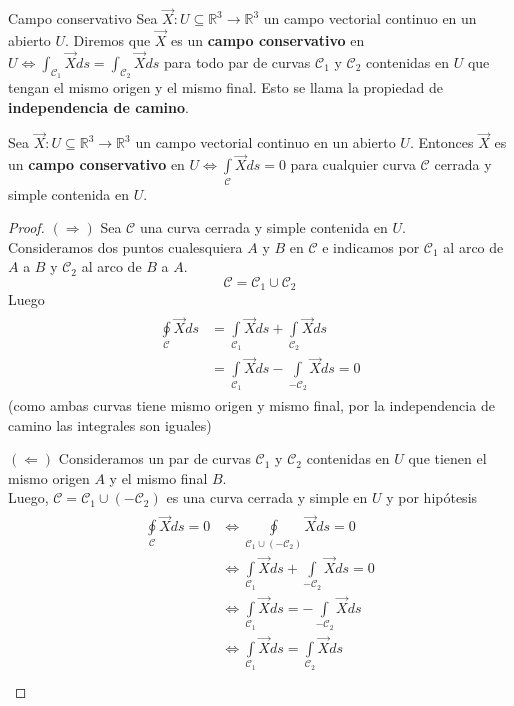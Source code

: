 \documentclass{report}
\newcommand\reals{\mathds{R}}
\begin{document}
\begin{defbox}{Campo conservativo}
	Sea $\vec{X}:U \subseteq \reals^3 \rightarrow \reals^3$ un campo vectorial continuo en un abierto $U$.
	Diremos que $\vec{X}$ es un \textbf{campo conservativo} en $U \iff \int_{\mathcal{C}_1}{\vec{X}ds} = \int_{\mathcal{C}_2}{\vec{X}ds}$
	para todo par de curvas $\mathcal{C}_1$ y $\mathcal{C}_2$ contenidas en $U$ que tengan el mismo origen y  el mismo final.
	Esto se llama la propiedad de \textbf{independencia de camino}.
\end{defbox}

\begin{propobox}
	Sea $\vec{X}: U \subseteq \reals^3 \rightarrow \reals^3$ un campo vectorial continuo en un abierto $U$. Entonces
	$\vec{X}$ es un \textbf{campo conservativo} en $U \iff \int\limits_{\mathcal{C}}{\vec{X}ds} = 0$ para cualquier curva $\mathcal{C}$ cerrada y simple contenida en $U$. 
\end{propobox}
\begin{proof}
	$(\Rightarrow )$ Sea $\mathcal{C}$ una curva cerrada y simple contenida en $U$. \\ 
	Consideramos dos puntos cualesquiera $A$ y $B$ en $\mathcal{C}$ e indicamos por $\mathcal{C}_1$ al arco de $A$ a $B$ y $\mathcal{C}_2$ al arco de $B$ a $A$. \\ 
	\[
		\mathcal{C} = \mathcal{C}_1 \cup \mathcal{C}_2
	\]
	Luego
	\begin{gather*}
		\begin{aligned}
			\oint\limits_{\mathcal{C}}{\vec{X}ds} & = \int\limits_{\mathcal{C}_1}{\vec{X}ds} + \int\limits_{\mathcal{C}_2}{\vec{X}ds} \\ 
												  & = \int\limits_{\mathcal{C}_1}{\vec{X}ds} - \int\limits_{-\mathcal{C}_2}{\vec{X}ds} = 0 		
		\end{aligned}
	\end{gather*}
	(como ambas curvas tiene mismo origen y mismo final, por la independencia de camino las integrales son iguales)

	$(\Leftarrow)$ Consideramos un par de curvas $\mathcal{C}_1$ y $\mathcal{C}_2$ contenidas en $U$ que tienen el mismo origen $A$ y el mismo final $B$. \\ 
	Luego, $\mathcal{C} = \mathcal{C}_1 \cup (-\mathcal{C}_2)$ es una curva cerrada y simple en $U$ y por hipótesis
	\begin{gather*}
		\begin{aligned}
			\oint\limits_{\mathcal{C}}{\vec{X}ds} = 0 & \iff \oint\limits_{\mathcal{C}_1 \cup (-\mathcal{C}_2)}{\vec{X}ds} = 0 \\
													  & \iff \int\limits_{\mathcal{C}_1}{\vec{X}ds} + \int\limits_{-\mathcal{C}_2}{\vec{X}ds}  = 0 \\ 
													  & \iff \int\limits_{\mathcal{C}_1}{\vec{X}ds} = - \int\limits_{-\mathcal{C}_2}{\vec{X}ds} \\ 
													  & \iff \int\limits_{\mathcal{C}_1}{\vec{X}ds} =  \int\limits_{\mathcal{C}_2}{\vec{X}ds} \\ 
		\end{aligned}
	\end{gather*}
\end{proof}
\end{document}
